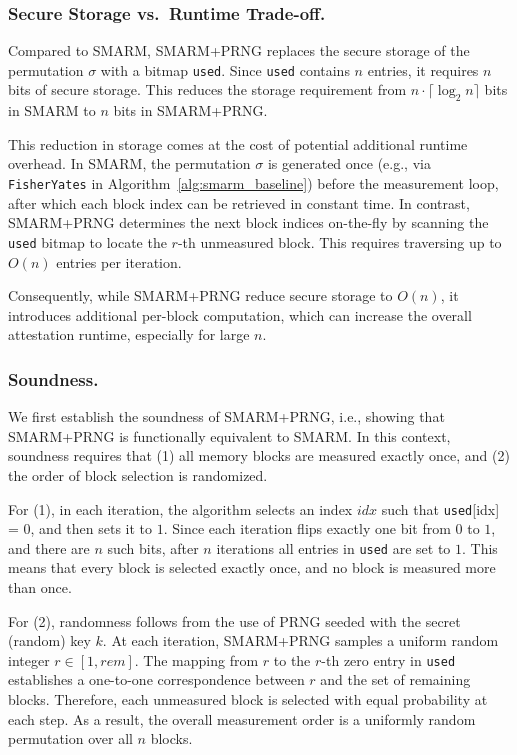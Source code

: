 \documentclass{ieeeaccess}
\newcommand{\rtsmarmone}{SMARM+PRNG\xspace}
\begin{document}
\subsubsection{Secure Storage vs.\ Runtime Trade-off.}
Compared to SMARM, \rtsmarmone replaces the secure storage of the permutation $\sigma$ with a bitmap \texttt{used}.
Since \texttt{used} contains $n$ entries, it requires $n$ bits of secure storage.
This reduces the storage requirement from $n \cdot \lceil \log_2 n \rceil$ bits in SMARM to $n$ bits in \rtsmarmone.

This reduction in storage comes at the cost of potential additional runtime overhead.
In SMARM, the permutation $\sigma$ is generated once (e.g., via \texttt{FisherYates} in Algorithm~\ref{alg:smarm_baseline}) before the measurement loop, after which each block index can be retrieved in constant time.
In contrast, \rtsmarmone determines the next block indices on-the-fly by scanning the \texttt{used} bitmap to locate the $r$-th unmeasured block.
This requires traversing up to $O(n)$ entries per iteration.

Consequently, while \rtsmarmone reduce secure storage to $O(n)$, it introduces additional per-block computation, which can increase the overall attestation runtime, especially for large $n$.



\subsubsection{Soundness.}\label{subsubsec:v1-sound}
We first establish the soundness of \rtsmarmone, i.e., showing that \rtsmarmone is functionally equivalent to SMARM.
In this context, soundness requires that (1) all memory blocks are measured exactly once, and (2) the order of block selection is randomized.

For (1), in each iteration, the algorithm selects an index $idx$ such that \texttt{used}[idx] = 0, and then sets it to $1$.
Since each iteration flips exactly one bit from $0$ to $1$, and there are $n$ such bits, after $n$ iterations all entries in \texttt{used} are set to $1$.
This means that every block is selected exactly once, and no block is measured more than once.

For (2), randomness follows from the use of PRNG seeded with the secret (random) key $k$.
At each iteration, \rtsmarmone samples a uniform random integer $r \in [1, rem]$.
The mapping from $r$ to the $r$-th zero entry in \texttt{used} establishes a one-to-one correspondence between $r$ and the set of remaining blocks.
Therefore, each unmeasured block is selected with equal probability at each step.
As a result, the overall measurement order is a uniformly random permutation over all $n$ blocks.
\end{document}
